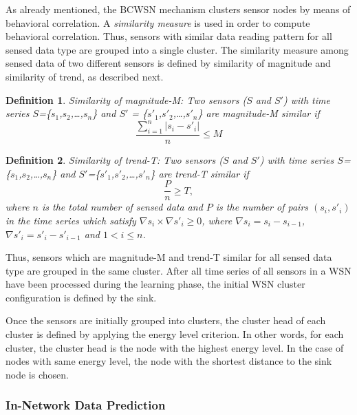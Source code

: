 \documentclass{acm_proc_article-sp}
\begin{document}
As already mentioned, the BCWSN mechanism clusters sensor nodes by means of
behavioral correlation. A \textit{similarity measure} \cite{Liu2007} is used in
order to compute behavioral correlation. Thus, sensors with similar data reading
pattern for all sensed data type are grouped into a single cluster.
The similarity measure among sensed data of two different sensors is defined by
similarity of magnitude and similarity of trend, as described next.

\newtheorem{defini}{Definition}

\begin{defini}
Similarity of magnitude-M: Two sensors ($S$ and $S'$) with time series
$S$=\{$s_{1}$,$s_{2}$,\ldots,$s_{n}$\} and
$S'$ = \{$s'_{1}$,$s'_{2}$,\ldots,$s'_{n}$\} are magnitude-M similar if 
\begin{equation}
\label{equ:magni}
\frac{\sum_{i=1}^{n} |s_{i}-s'_{i}|}{n} \leq M
\end{equation}
\end{defini}

\begin{defini}
Similarity of trend-T: Two sensors ($S$ and $S'$) with time series
$S$=\{$s_{1}$,$s_{2}$,\ldots,$s_{n}$\} and
$S'$=\{$s'_{1}$,$s'_{2}$,\ldots,$s'_{n}$\} are trend-T similar if 
\begin{equation}
\label{equ:trend}
\frac{P}{n} \geq T,
\end{equation}
where $n$ is the total number of sensed data and $P$ is the number of pairs
$(s_{i},s'_{i})$ in the time series which satisfy $\nabla s_{i} \times \nabla
s'_{i} \geq 0$, where $\nabla s_{i} = s_{i} - s_{i-1}$, $\nabla
s'_{i} = s'_{i} - s'_{i-1}$ and $1 < i \leq n$.
\end{defini}

Thus, sensors which are magnitude-M and trend-T similar for all sensed data
type are grouped in the same cluster. After all time series of all sensors
in a WSN have been processed during the learning phase, the initial WSN cluster
configuration is defined by the sink.

Once the sensors are initially grouped into clusters, the cluster head of each
cluster is defined by applying the energy level criterion.
In other words, for each cluster, the cluster head is the node with the highest
energy level. In the case of nodes with same energy level, the node with the
shortest distance to the sink node is chosen.


\subsubsection{In-Network Data Prediction}
\label{data-predict}
\end{document}
